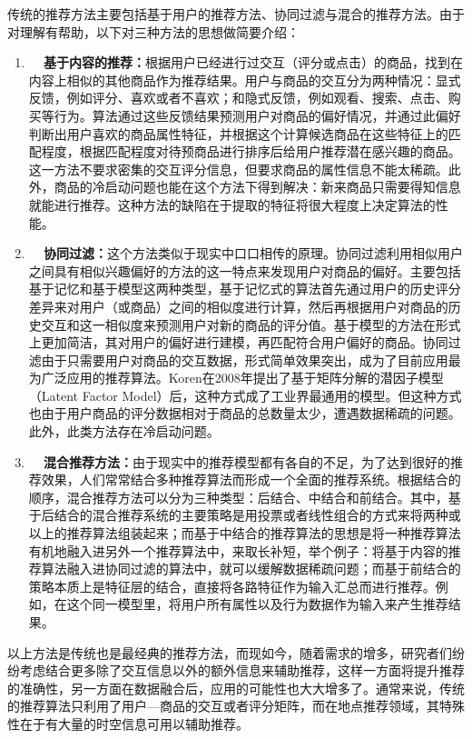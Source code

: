 传统的推荐方法主要包括基于用户的推荐方法、协同过滤与混合的推荐方法。由于对理解有帮助，以下对三种方法的思想做简要介绍：
\begin{enumerate}
    \item \textbf{~~基于内容的推荐：}根据用户已经进行过交互（评分或点击）的商品，找到在内容上相似的其他商品作为推荐结果。用户与商品的交互分为两种情况：显式反馈，例如评分、喜欢或者不喜欢；和隐式反馈，例如观看、搜索、点击、购买等行为。算法通过这些反馈结果预测用户对商品的偏好情况，并通过此偏好判断出用户喜欢的商品属性特征，并根据这个计算候选商品在这些特征上的匹配程度，根据匹配程度对待预商品进行排序后给用户推荐潜在感兴趣的商品。这一方法不要求密集的交互评分信息，但要求商品的属性信息不能太稀疏。此外，商品的冷启动问题也能在这个方法下得到解决：新来商品只需要得知信息就能进行推荐。这种方法的缺陷在于提取的特征将很大程度上决定算法的性能。

    \item \textbf{~~协同过滤：}这个方法类似于现实中口口相传的原理。协同过滤利用相似用户之间具有相似兴趣偏好的方法的这一特点来发现用户对商品的偏好。主要包括基于记忆和基于模型这两种类型，基于记忆式的算法首先通过用户的历史评分差异来对用户（或商品）之间的相似度进行计算，然后再根据用户对商品的历史交互和这一相似度来预测用户对新的商品的评分值。基于模型的方法在形式上更加简洁，其对用户的偏好进行建模，再匹配符合用户偏好的商品。协同过滤由于只需要用户对商品的交互数据，形式简单效果突出，成为了目前应用最为广泛应用的推荐算法。Koren在2008年提出了基于矩阵分解的潜因子模型（Latent Factor Model）后，这种方式成了工业界最通用的模型。但这种方式也由于用户商品的评分数据相对于商品的总数量太少，遭遇数据稀疏的问题。此外，此类方法存在冷启动问题。

    \item \textbf{~~混合推荐方法：}由于现实中的推荐模型都有各自的不足，为了达到很好的推荐效果，人们常常结合多种推荐算法而形成一个全面的推荐系统。根据结合的顺序，混合推荐方法可以分为三种类型：后结合、中结合和前结合。其中，基于后结合的混合推荐系统的主要策略是用投票或者线性组合的方式来将两种或以上的推荐算法组装起来；而基于中结合的推荐算法的思想是将一种推荐算法有机地融入进另外一个推荐算法中，来取长补短，举个例子：将基于内容的推荐算法融入进协同过滤的算法中，就可以缓解数据稀疏问题；而基于前结合的策略本质上是特征层的结合，直接将各路特征作为输入汇总而进行推荐。例如，在这个同一模型里，将用户所有属性以及行为数据作为输入来产生推荐结果。
\end{enumerate}

以上方法是传统也是最经典的推荐方法，而现如今，随着需求的增多，研究者们纷纷考虑结合更多除了交互信息以外的额外信息来辅助推荐，这样一方面将提升推荐的准确性，另一方面在数据融合后，应用的可能性也大大增多了。通常来说，传统的推荐算法只利用了用户—商品的交互或者评分矩阵，而在地点推荐领域，其特殊性在于有大量的时空信息可用以辅助推荐。

